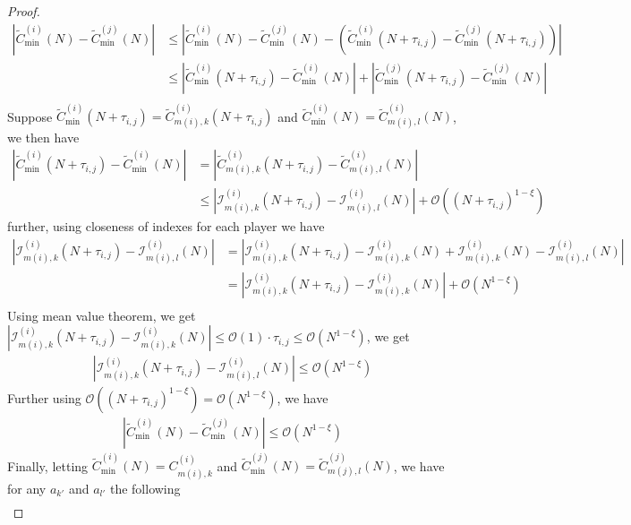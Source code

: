 \documentclass[10pt,a4paper]{amsart}
\begin{document}
\begin{proof}
\begin{align*}
    |\tilde{C}^{(i)}_{\min}(N)-\tilde{C}^{(j)}_{\min}(N)|&\leq |\tilde{C}^{(i)}_{\min}(N)-\tilde{C}^{(j)}_{\min}(N)- (\tilde{C}^{(i)}_{\min}(N+\tau_{i,j})-\tilde{C}^{(j)}_{\min}(N+\tau_{i,j}))|\\
    &\leq |\tilde{C}^{(i)}_{\min}(N+\tau_{i,j})-\tilde{C}^{(i)}_{\min}(N)| + |\tilde{C}^{(j)}_{\min}(N+\tau_{i,j})-\tilde{C}^{(j)}_{\min}(N)|\\
\end{align*}
Suppose $\tilde{C}^{(i)}_{\min}(N+\tau_{i,j})=\tilde{C}^{(i)}_{m(i),k}(N+\tau_{i,j})$ and $\tilde{C}^{(i)}_{\min}(N)=\tilde{C}^{(i)}_{m(i),l}(N)$, we then have
\begin{align*}
     |\tilde{C}^{(i)}_{\min}(N+\tau_{i,j})-\tilde{C}^{(i)}_{\min}(N)| &= |\tilde{C}^{(i)}_{m(i),k}(N+\tau_{i,j})-\tilde{C}^{(i)}_{m(i),l}(N)| \\
     &\leq |\mathcal{I}^{(i)}_{m(i),k}(N+\tau_{i,j})-\mathcal{I}^{(i)}_{m(i),l}(N)|  +\mathcal{O}\left((N+\tau_{i,j})^{1-\xi}\right)
\end{align*}
further, using closeness of indexes for each player we have
\begin{align*}
    |\mathcal{I}^{(i)}_{m(i),k}(N+\tau_{i,j})-\mathcal{I}^{(i)}_{m(i),l}(N)| &=  |\mathcal{I}^{(i)}_{m(i),k}(N+\tau_{i,j})-\mathcal{I}^{(i)}_{m(i),k}(N)+\mathcal{I}^{(i)}_{m(i),k}(N)-\mathcal{I}^{(i)}_{m(i),l}(N)| \\
    &= |\mathcal{I}^{(i)}_{m(i),k}(N+\tau_{i,j})-\mathcal{I}^{(i)}_{m(i),k}(N)|+\mathcal{O}(N^{1-\xi})\\
\end{align*}
Using mean value theorem, we get $|\mathcal{I}^{(i)}_{m(i),k}(N+\tau_{i,j})-\mathcal{I}^{(i)}_{m(i),k}(N)| \leq \mathcal{O}(1)\cdot \tau_{i,j}\leq \mathcal{O}(N^{1-\xi})$, we get
\begin{align*}
     |\mathcal{I}^{(i)}_{m(i),k}(N+\tau_{i,j})-\mathcal{I}^{(i)}_{m(i),l}(N)|\leq \mathcal{O}(N^{1-\xi})
\end{align*}
 Further using $\mathcal{O}\left((N+\tau_{i,j})^{1-\xi}\right)= \mathcal{O}(N^{1-\xi})$, we have
 \begin{align*}
     |\tilde{C}^{(i)}_{\min}(N)-\tilde{C}^{(j)}_{\min}(N)| \leq \mathcal{O}(N^{1-\xi})
 \end{align*}
 Finally, letting $\tilde{C}^{(i)}_{\min}(N)=C^{(i)}_{m(i),k}$ and $\tilde{C}^{(j)}_{\min}(N)=\tilde{C}^{(j)}_{m(j),l}(N)$, we have for any $a_{k'}$ and $a_{l'}$ the following
 \begin{align*}

\end{align*}
\end{proof}
\end{document}
